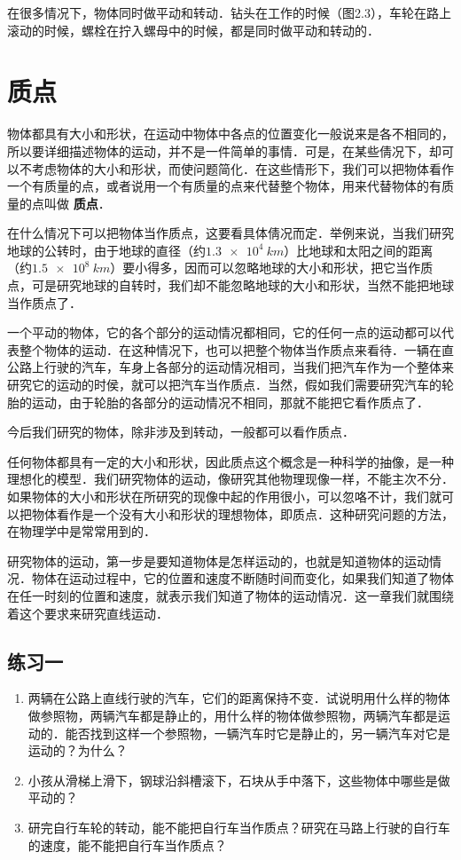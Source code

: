 在很多情况下，物体同时做平动和转动．钻头在工作的时候（图2.3），车轮在路上滚动的时候，螺栓在拧入螺母中的时候，都是同时做平动和转动的．

\newpage

\section{质点}

物体都具有大小和形状，在运动中物体中各点的位置变化一般说来是各不相同的，所以要详细描述物体的运动，并不是一件简单的事情．可是，在某些倩况下，却可以不考虑物体的大小和形状，而使问题简化．在这些情形下，我们可以把物体看作一个有质量的点，或者说用一个有质量的点来代替整个物体，用来代替物体的有质量的点叫做\textbf{ 质点}．

在什么情况下可以把物体当作质点，这要看具体倩况而定．举例来说，当我们研究地球的公转时，由于地球的直径（约$\qty{1.3e4}{km}$）比地球和太阳之间的距离（约$\qty{1.5e8}{km}$）要小得多，因而可以忽略地球的大小和形状，把它当作质点，可是研究地球的自转时，我们却不能忽略地球的大小和形状，当然不能把地球当作质点了．

一个平动的物体，它的各个部分的运动情况都相同，它的任何一点的运动都可以代表整个物体的运动．在这种情况下，也可以把整个物体当作质点来看待．一辆在直公路上行驶的汽车，车身上各部分的运动情况相司，当我们把汽车作为一个整体来研究它的运动的时侯，就可以把汽车当作质点．当然，假如我们需要研究汽车的轮胎的运动，由于轮胎的各部分的运动情况不相同，那就不能把它看作质点了．

今后我们研究的物体，除非涉及到转动，一般都可以看作质点．

任何物体都具有一定的大小和形状，因此质点这个概念是一种科学的抽像，是一种理想化的模型．我们研究物体的运动，像研究其他物理现像一样，不能主次不分．如果物体的大小和形状在所研究的现像中起的作用很小，可以忽咯不计，我们就可以把物体看作是一个没有大小和形状的理想物体，即质点．这种研究问题的方法，在物理学中是常常用到的．

研究物体的运动，第一步是要知道物体是怎样运动的，也就是知道物体的运动情况．物体在运动过程中，它的位置和速度不断随时间而变化，如果我们知道了物体在任一时刻的位置和速度，就表示我们知道了物体的运动情况．这一章我们就围绕着这个要求来研究直线运动．

\subsection*{练习一}
\begin{enumerate}
    \item 两辆在公路上直线行驶的汽车，它们的距离保持不变．试说明用什么样的物体做参照物，两辆汽车都是静止的，用什么样的物体做参照物，两辆汽车都是运动的．能否找到这样一个参照物，一辆汽车时它是静止的，另一辆汽车对它是运动的？为什么？

    \item 小孩从滑梯上滑下，钢球沿斜槽滚下，石块从手中落下，这些物体中哪些是做平动的？

    \item 研完自行车轮的转动，能不能把自行车当作质点？研究在马路上行驶的自行车的速度，能不能把自行车当作质点？
\end{enumerate}

